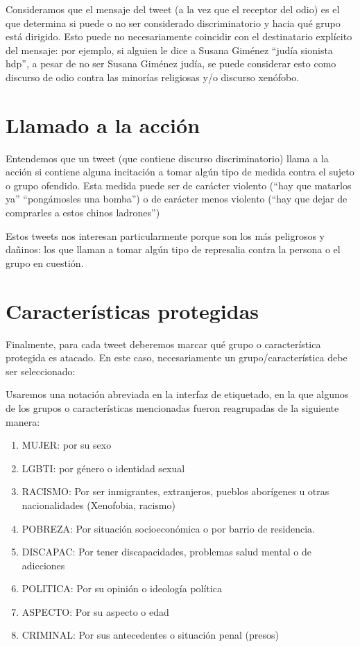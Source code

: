 Consideramos que el mensaje del tweet (a la vez que el receptor del odio) es el que determina si puede o no ser considerado discriminatorio y hacia qué grupo está dirigido. Esto puede no necesariamente coincidir con el destinatario explícito del mensaje: por ejemplo, si alguien le dice a Susana Giménez “judía sionista hdp”, a pesar de no ser Susana Giménez judía, se puede considerar esto como discurso de odio contra las minorías religiosas y/o discurso xenófobo.


\section{Llamado a la acción}

Entendemos que un tweet (que contiene discurso discriminatorio) llama a la acción si contiene alguna incitación a tomar algún tipo de medida contra el sujeto o grupo ofendido. Esta medida puede ser de carácter violento (“hay que matarlos ya” “pongámosles una bomba”) o de carácter menos violento (“hay que dejar de comprarles a estos chinos ladrones”)

Estos tweets nos interesan particularmente porque son los más peligrosos y dañinos: los que llaman a tomar algún tipo de represalia contra la persona o el grupo en cuestión. 

\section{Características protegidas}

Finalmente, para cada tweet deberemos marcar qué grupo o característica protegida es atacado. En este caso, necesariamente un grupo/característica debe ser seleccionado:

Usaremos una notación abreviada en la interfaz de etiquetado, en la que algunos de los grupos o características mencionadas fueron reagrupadas de la siguiente manera:

\begin{enumerate}
    \item MUJER: por su sexo
    \item LGBTI: por género o identidad sexual
    \item RACISMO: Por ser inmigrantes, extranjeros, pueblos aborígenes u otras nacionalidades (Xenofobia, racismo)
    \item POBREZA: Por situación socioeconómica o por barrio de residencia.
    \item DISCAPAC: Por tener discapacidades, problemas salud mental o de adicciones
    \item POLITICA: Por su opinión o ideología política
    \item ASPECTO: Por su aspecto o edad
    \item CRIMINAL: Por sus antecedentes o situación penal (presos)
\end{enumerate}


